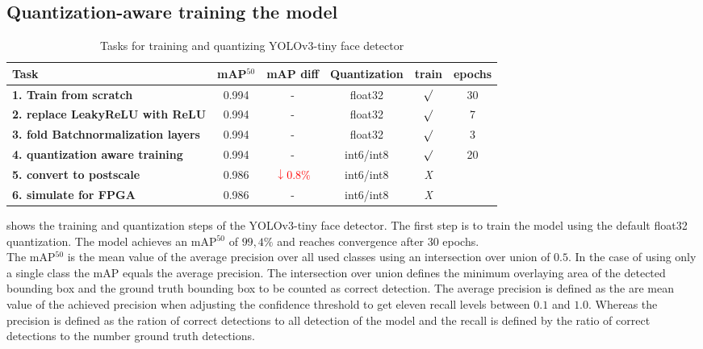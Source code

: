 \documentclass[%
a4paper,
twoside,
openany,
dvipsnames
]
{report}
\begin{document}
	\subsection{Quantization-aware training the model}
	\begin{table}[h]
		\centering
		\begin{tabular}{lc cc c c}
			\toprule[1.5pt]
			\textbf{Task} & \textbf{mAP}$^{50}$ & \textbf{mAP diff} & \textbf{Quantization} & \textbf{train} &\textbf{epochs}  \\
			\midrule[1.5pt] 
			\textbf{1. Train from scratch} & 0.994 & - & float32 & $\surd$ & 30 \\
			\textbf{2. replace LeakyReLU with ReLU} & 0.994 & - & float32 & $\surd$ & 7  \\
			\textbf{3. fold Batchnormalization layers}  & 0.994 & - & float32 & $\surd$ & 3 \\
			\textbf{4. quantization aware training} & 0.994 & - & int6/int8 & $\surd$ & 20  \\
			\textbf{5. convert to postscale} & 0.986 &  \textcolor{red}{$\downarrow 0.8\%$} & int6/int8 & \textit{X} & \\
			\textbf{6. simulate for FPGA}  & 0.986 & - & int6/int8 & \textit{X} &  \\  							
			\bottomrule[1.5pt]
		\end{tabular}
		\caption{Tasks for training and quantizing YOLOv3-tiny face detector}	
		\label{tab:quantization-tasks}
	\end{table}
	 shows the training and quantization steps of the YOLOv3-tiny face detector. The first step is to train the model using the default float32 quantization. The model achieves an \gls{mAP}$^{50}$ of $99,4\%$ and reaches convergence after 30 epochs. \\
	The \gls{mAP}$^{50}$ is the  mean value of the average precision over all used classes using an intersection over union of $0.5$. In the case of using only a single class the \gls{mAP} equals the average precision. The intersection over union defines the minimum overlaying area of the detected bounding box and the ground truth bounding box to be counted as correct detection. The average precision is defined as the are mean value of the achieved precision when adjusting the confidence threshold to get eleven recall levels between $0.1$ and $1.0$. Whereas the precision is defined as the ration of correct detections to all detection of the model and the recall is defined by the ratio of correct detections to the number ground truth detections. \\
\end{document}
